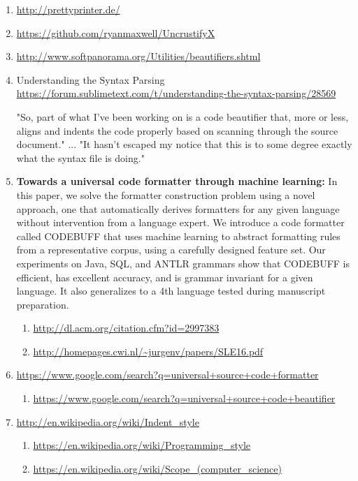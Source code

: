 \begin{sloppypar}
\begin{bluebox}
\begin{enumerate}[leftmargin=*,parsep=0pt]
    \item \url{http://prettyprinter.de/}

    \item \url{https://github.com/ryanmaxwell/UncrustifyX}

    \item \url{http://www.softpanorama.org/Utilities/beautifiers.shtml}

    \item Understanding the Syntax Parsing
    \url{https://forum.sublimetext.com/t/understanding-the-syntax-parsing/28569}

    "So, part of what I've been working on is a code beautifier that, more or less, aligns and
    indents the code properly based on scanning through the source document."
    ...
    "It hasn't escaped my notice that this is to some degree exactly what the syntax file is doing."

    \item

    {\bfseries Towards a universal code formatter through machine learning:}
    In this paper, we solve the formatter construction problem using a novel approach, one that
    automatically derives formatters for any given language without intervention from a language
    expert. We introduce a code formatter called CODEBUFF that uses machine learning to abstract
    formatting rules from a representative corpus, using a carefully designed feature set. Our
    experiments on Java, SQL, and ANTLR grammars show that CODEBUFF is efficient, has excellent
    accuracy, and is grammar invariant for a given language. It also generalizes to a 4th language
    tested during manuscript preparation.
    \begin{enumerate}[nolistsep,topsep=0pt,label=$\star$]
        \item \url{http://dl.acm.org/citation.cfm?id=2997383}
        \item \url{http://homepages.cwi.nl/~jurgenv/papers/SLE16.pdf}
    \end{enumerate}

    \item \url{https://www.google.com/search?q=universal+source+code+formatter}
    \begin{enumerate}[nolistsep,topsep=0pt,label=$\star$]
        \item \url{https://www.google.com/search?q=universal+source+code+beautifier}
    \end{enumerate}

    \item \url{http://en.wikipedia.org/wiki/Indent_style}
    \begin{enumerate}[nolistsep,topsep=0pt,label=$\star$]
        \item \url{https://en.wikipedia.org/wiki/Programming_style}
        \item \url{https://en.wikipedia.org/wiki/Scope_(computer_science)}
    \end{enumerate}


\end{enumerate}
\end{bluebox}
\end{sloppypar}
